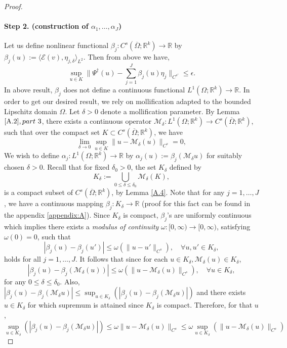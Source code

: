 \documentclass[reqno,9pt]{amsart}
\theoremstyle{plain}
\theoremstyle{definition}
\newcommand{\bb}[1]{\mathbb{#1}}
\newcommand{\cal}[1]{\mathcal{#1}}
\begin{document}
\begin{proof}
    \paragraph{\bf Step 2. (construction of $\alpha_1, \dots, \alpha_J$)}
    Let us define nonlinear functional $\beta_j: C^s(\overline{\Omega};\bb R^k) \to \bb R$ by  $\beta_j(u) := \langle \cal E (v),\eta_{j,\delta} \rangle_{L^2}$. Then from above we have,
    \begin{equation} \label{4}
        \sup\limits_{u \in K}\|\Psi^\dag(u) - \sum_{j=1}^{J}\beta_j(u)\eta_j\|_{C^{s'}} \leq \epsilon.
    \end{equation}
    In above result, $\beta_j$ does not define a continuous functional $L^1(\Omega;\bb R^k) \to \bb R$. In order to get our desired result, we rely on mollification adapted to the bounded Lipschitz domain $\Omega$. Let $\delta > 0$ denote a mollification parameter. By Lemma $\ref{A.2}, part ~3$, there exists a continuous operator $\cal M_\delta : L^1(\Omega;\bb R^k) \to C^s(\overline{\Omega};\bb R^k)$, such that over the compact set $K \subset C^s(\overline{\Omega};\bb R^k)$, we have 
    $$ \lim_{\delta \to 0}\sup\limits_{u \in K}\|u - \cal M_\delta (u)\|_{C^s} = 0,$$
    We wish to define $\alpha_j : L^1(\Omega;\bb R^k) \to \bb R$ by $\alpha_j(u):= \beta_j(\cal M_\delta u)$ for suitably chosen $\delta > 0$. Recall that for fixed $\delta_0 > 0$, the set $K_\delta$ defined by 
    $$ K_\delta := \bigcup\limits_{0\leq\delta\leq\delta_0} \cal M_\delta (K),$$
    is a compact subset of $C^s(\overline{\Omega};\bb R^k)$, by Lemma \ref{A.4}. Note that for any $j = 1, \dots, J$, we have a continuous mapping $\beta_j : K_\delta \to \bb R$ (proof for this fact can be found in the appendix \ref{appendix:A}). Since $K_\delta$ is compact, $\beta_j$'s are uniformly continuous which implies there exists a {\it modulus of continuity} $\omega : [0,\infty) \to [0, \infty)$, satisfying $\omega(0) = 0$, such that
    $$ |\beta_j(u) - \beta_j(u')| \leq \omega(\|u - u'\|_{C^s}), \quad \forall u,u' \in K_\delta,$$
    holds for all $j = 1, \dots, J$. It follows that since for each $u\in K_\delta, \cal M_\delta(u) \in K_\delta$,
    $$|\beta_j(u) - \beta_j(\cal M_\delta(u))| \leq \omega(\|u - \cal M_\delta(u)\|_{C^s}), \quad \forall u \in K_\delta,$$
    for any $0 \leq \delta \leq \delta_0$. Also, $|\beta_j(u) - \beta_j(\cal M_\delta u)| \leq \sup_{u \in K_\delta}(|\beta_j(u) - \beta_j(\cal M_\delta u)|)$ and there exists $u \in K_\delta$ for which supremum is attained since $K_\delta$ is compact. Therefore, for that $u$,
    $$ \sup\limits_{u \in K_\delta}(|\beta_j(u) - \beta_j(\cal M_\delta u)|)\leq \omega \|u - \cal M_\delta (u)\|_{C^s} \leq \omega \sup\limits_{u \in K_\delta} \left(\|u - \cal M_\delta (u)\|_{C^s}\right)$$

\end{proof}
\end{document}
